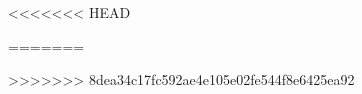 \documentclass[10pt,fleqn]{beamer}
\begin{document}






<<<<<<< HEAD



=======



%

%
>>>>>>> 8dea34c17fc592ae4e105e02fe544f8e6425ea92


\end{document}
